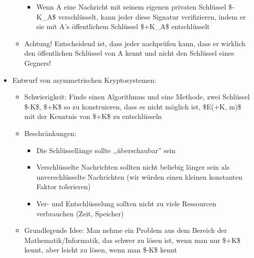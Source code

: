 \documentclass[a4paper]{article}
\begin{document}
\begin{multicols}{3}
\begin{itemize}
\begin{itemize}
                        \begin{itemize}
                            \item
                                  Wenn A eine Nachricht mit seinem eigenen privaten Schlüssel
                                  \$-K\_A\$ verschlüsselt, kann jeder diese Signatur verifizieren,
                                  indem er sie mit A's öffentlichem Schlüssel \$+K\_A\$
                                  entschlüsselt
                        \end{itemize}
                  \item
                        Achtung! Entscheidend ist, dass jeder nachprüfen kann, dass er
                        wirklich den öffentlichen Schlüssel von A kennt und nicht den
                        Schlüssel eines Gegners!
              \end{itemize}
        \item
              Entwurf von asymmetrischen Kryptosystemen:

              \begin{itemize}
                  \item
                        Schwierigkeit: Finde einen Algorithmus und eine Methode, zwei
                        Schlüssel \$-K\$, \$+K\$ so zu konstruieren, dass es nicht möglich
                        ist, \$E(+K, m)\$ mit der Kenntnis von \$+K\$ zu entschlüsseln
                  \item
                        Beschränkungen:

                        \begin{itemize}
                            \item
                                  Die Schlüssellänge sollte ,,überschaubar'' sein
                            \item
                                  Verschlüsselte Nachrichten sollten nicht beliebig länger sein als
                                  unverschlüsselte Nachrichten (wir würden einen kleinen konstanten
                                  Faktor tolerieren)
                            \item
                                  Ver- und Entschlüsselung sollten nicht zu viele Ressourcen
                                  verbrauchen (Zeit, Speicher)
                        \end{itemize}
                  \item
                        Grundlegende Idee: Man nehme ein Problem aus dem Bereich der
                        Mathematik/Informatik, das schwer zu lösen ist, wenn man nur \$+K\$
                        kennt, aber leicht zu lösen, wenn man \$-K\$ kennt


\end{itemize}
\end{itemize}
\end{multicols}
\end{document}
